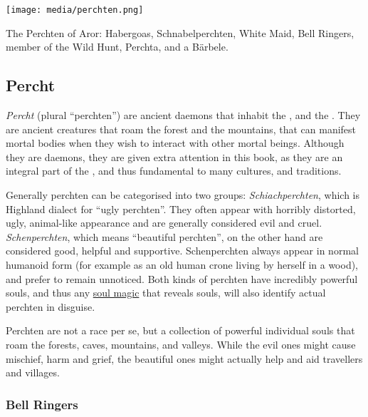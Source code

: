 \begin{figure*}[ht!]
    \centering
    \vspace{-2.6cm}
    \centerline{
        \texttt{[image: media/perchten.png]}
    }
    \par
    The Perchten of Aror: Habergoas, Schnabelperchten, White Maid, Bell
    Ringers, member of the Wild Hunt, Perchta, and a Bärbele.
\end{figure*}

\subsection{Percht}
\label{sec:Percht}

\emph{Percht} (plural ``perchten'') are ancient daemons that inhabit the
, and the . They are
ancient creatures that roam the forest and the mountains, that can manifest
mortal bodies when they wish to interact with other mortal beings. Although
they are daemons, they are given extra attention in this book, as they are
an integral part of the , and thus fundamental to many
cultures, and traditions.

Generally perchten can be categorised into two groups: \emph{Schiachperchten},
which is Highland dialect for ``ugly perchten''. They often appear with
horribly distorted, ugly, animal-like appearance and are generally considered
evil and cruel. \emph{Schenperchten}, which means ``beautiful perchten'', on
the other hand are considered good, helpful and supportive. Schenperchten
always appear in normal humanoid form (for example as an old human crone
living by herself in a wood), and prefer to remain unnoticed. Both kinds of
perchten have incredibly powerful souls, and thus any \hyperref[sec:Soul
  Magic]{soul magic} that reveals souls, will also identify actual perchten in
disguise.

Perchten are not a race per se, but a collection of powerful individual souls
that roam the forests, caves, mountains, and valleys. While the evil ones might
cause mischief, harm and grief, the beautiful ones might actually help and aid
travellers and villages.

\subsubsection{Bell Ringers}
\label{sec:Bell Ringers}

